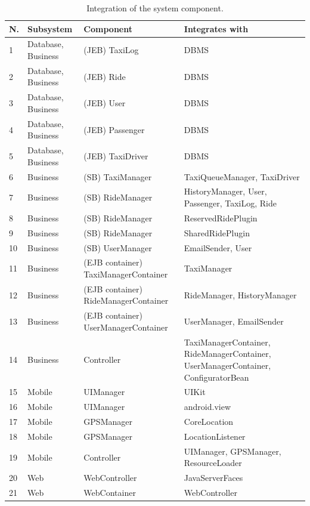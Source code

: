 \begin{table}
    \centering
    \begin{tabular}{| l | l | l | l |}
    	\hline
	N. & Subsystem & Component & Integrates with \\
	\hline
	1 & Database, Business & (JEB) TaxiLog & DBMS\\
	2 & Database, Business & (JEB)  Ride & DBMS\\
	3 & Database, Business & (JEB) User & DBMS\\
	4 & Database, Business & (JEB) Passenger & DBMS\\
	5 & Database, Business & (JEB) TaxiDriver & DBMS\\
	6 & Business & (SB) TaxiManager & TaxiQueueManager, TaxiDriver\\
	7 & Business & (SB) RideManager & HistoryManager, User, Passenger, TaxiLog, Ride\\
	8 & Business & (SB) RideManager & ReservedRidePlugin\\
	9 & Business & (SB) RideManager & SharedRidePlugin\\
	10  & Business & (SB) UserManager & EmailSender, User\\
	11  & Business & (EJB container) TaxiManagerContainer & TaxiManager\\
	12  & Business & (EJB container) RideManagerContainer & RideManager, HistoryManager\\
	13  & Business & (EJB container) UserManagerContainer & UserManager, EmailSender\\
	14  & Business & Controller & TaxiManagerContainer, RideManagerContainer, UserManagerContainer, ConfiguratorBean\\
	15  & Mobile & UIManager & UIKit\\
	16  & Mobile & UIManager & android.view\\
	17  & Mobile & GPSManager & CoreLocation\\
	18  & Mobile & GPSManager & LocationListener\\
	19  & Mobile & Controller & UIManager, GPSManager, ResourceLoader\\
	20  & Web & WebController & JavaServerFaces\\
	21 & Web & WebContainer & WebController\\
	\hline
    \end{tabular}
    \caption{Integration of the system component.}
    \label{tab:components-integration}
\end{table}


